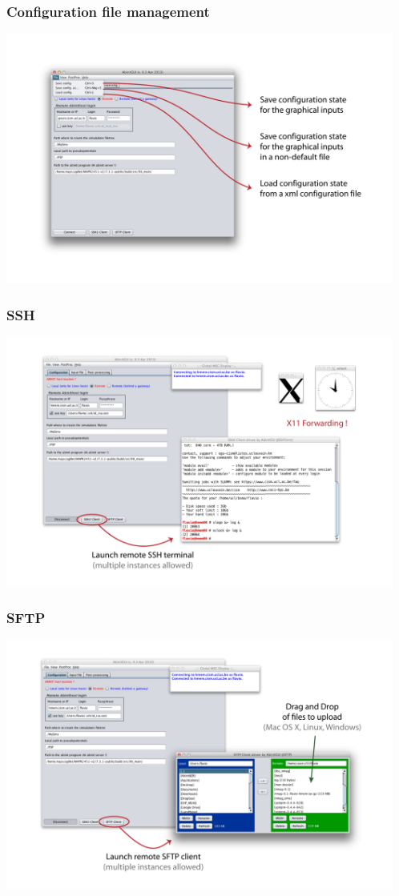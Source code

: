 \begin{frame}
 \frametitle{Configuration file management}
 \centering
 \includegraphics[height=8.25cm]{menu1}
\end{frame}

\begin{frame}
 \frametitle{SSH}
 \centering
 \includegraphics[height=8.25cm]{f4}
\end{frame}

\begin{frame}
 \frametitle{SFTP}
 \centering
 \includegraphics[height=8.25cm]{f5}
\end{frame}

